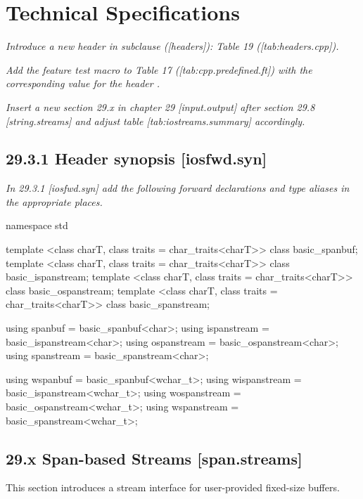 \documentclass[ebook,11pt,article]{memoir}
\begin{document}
\chapter{Technical Specifications}

\emph{Introduce a new header  in subclause ([headers]): Table 19 ([tab:headers.cpp]).}

\emph{Add the feature test macro  to Table 17 ([tab:cpp.predefined.ft]) with the corresponding value for the header .}

\emph{Insert a new section 29.x in chapter 29 [input.output] after section 29.8 [string.streams] and adjust table [tab:iostreams.summary] accordingly.}


\section{29.3.1 Header  synopsis [iosfwd.syn]}

\emph{In 29.3.1 [iosfwd.syn] add the following forward declarations and type aliases in the appropriate places.}

\begin{codeblock}
namespace std {
  template <class charT, class traits = char_traits<charT>>
    class basic_spanbuf;
  template <class charT, class traits = char_traits<charT>>
    class basic_ispanstream;
  template <class charT, class traits = char_traits<charT>>
    class basic_ospanstream;
  template <class charT, class traits = char_traits<charT>>
    class basic_spanstream;

  using spanbuf     = basic_spanbuf<char>;
  using ispanstream = basic_ispanstream<char>;
  using ospanstream = basic_ospanstream<char>;
  using spanstream  = basic_spanstream<char>;

  using wspanbuf     = basic_spanbuf<wchar_t>;
  using wispanstream = basic_ispanstream<wchar_t>;
  using wospanstream = basic_ospanstream<wchar_t>;
  using wspanstream  = basic_spanstream<wchar_t>;
}
\end{codeblock}



\section{29.x Span-based Streams [span.streams]}

\pnum
This section introduces a stream interface for user-provided fixed-size buffers. 
\end{document}
